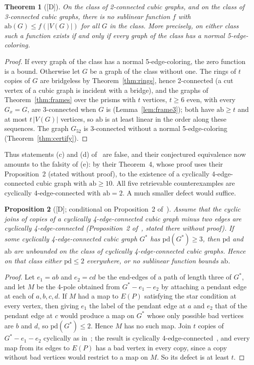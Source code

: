 \documentclass[11pt]{article}
\newtheorem{theorem}{Theorem}[section]
\newtheorem{proposition}[theorem]{Proposition}
\theoremstyle{definition}
\theoremstyle{remark}
\newcommand{\PG}{P}
\newcommand{\Gfty}{G_{52}}
\newcommand{\pd}{\mathrm{pd}}
\newcommand{\ab}{\mathrm{ab}}
\newcommand{\dd}{\textup{[D]}}
\begin{document}
\begin{theorem}[\dd]\label{thm:sublinear}
On the class of 2-connected cubic graphs, and on the class of 3-connected cubic graphs, there is
no sublinear function $f$ with $\ab(G) \le f(|V(G)|)$ for all $G$ in the class. More precisely, on
either class such a function exists if and only if every graph of the class has a normal
5-edge-coloring.
\end{theorem}

\begin{proof}
If every graph of the class has a normal 5-edge-coloring, the zero function is a bound. Otherwise
let $G$ be a graph of the class without one. The rings of $t$ copies of $G$ are bridgeless by
Theorem~\ref{thm:rings}, hence 2-connected (a cut vertex of a cubic graph is incident with a bridge), and
the graphs of Theorem~\ref{thm:frames} over the prisms with $t$ vertices, $t \ge 6$ even, with
every $G_x = G$, are 3-connected when $G$ is (Lemma~\ref{lem:frame3}); both have $\ab \ge t$ and at
most $t\,|V(G)|$ vertices, so $\ab$ is at least linear in the order along these sequences. The graph
$\Gfty$ is 3-connected without a normal 5-edge-coloring (Theorem~\ref{thm:certify}).
\end{proof}

Thus statements (c) and (d) of~\cite{MMM2021} are false, and their conjectured equivalence now
amounts to the falsity of (e): by their Theorem~4, whose proof uses their Proposition~2 (stated without
proof), to the existence of a cyclically 4-edge-connected cubic graph with $\ab \ge 10$. All five retrievable counterexamples are
cyclically 4-edge-connected with $\ab = 2$. A much smaller defect would suffice.

\begin{proposition}[\dd; conditional on Proposition~2 of~\cite{MMM2021}]\label{prop:threshold}
Assume that the cyclic joins of copies of a cyclically 4-edge-connected cubic graph minus two edges are
cyclically 4-edge-connected (Proposition~2 of~\cite{MMM2021}, stated there without proof). If some
cyclically 4-edge-connected cubic graph $G^*$ has $\pd(G^*) \ge 3$, then $\pd$ and $\ab$
are unbounded on the class of cyclically 4-edge-connected cubic graphs. Hence on that class either
$\pd \le 2$ everywhere, or no sublinear function bounds $\ab$.
\end{proposition}

\begin{proof}
Let $e_1 = ab$ and $e_2 = cd$ be the end-edges of a path of length three of $G^*$, and let $M$ be
the 4-pole obtained from $G^* - e_1 - e_2$ by attaching a pendant edge at each of $a, b, c, d$.
If $M$ had a map to $E(\PG)$ satisfying the star condition at every vertex, then giving $e_1$ the
label of the pendant edge at $a$ and $e_2$ that of the pendant edge at $c$ would produce a map on
$G^*$ whose only possible bad vertices are $b$ and $d$, so $\pd(G^*) \le 2$. Hence $M$ has no such
map. Join $t$ copies of $G^* - e_1 - e_2$ cyclically as in~\cite{MMM2021}; the result is
cyclically 4-edge-connected~\cite[Proposition~2]{MMM2021}, and every map from its edges to
$E(\PG)$ has a bad vertex in every copy, since a copy without bad vertices would restrict to a map
on $M$. So its defect is at least $t$.
\end{proof}
\end{document}
